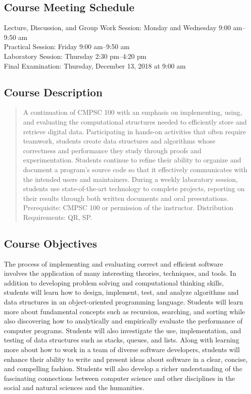 \documentclass[11pt]{article}
\begin{document}
\subsection*{Course Meeting Schedule}

Lecture, Discussion, and Group Work Session: Monday and Wednesday 9:00 am--9:50 am \\
Practical Session: Friday 9:00 am--9:50 am \\
Laboratory Session: Thursday 2:30 pm--4:20 pm \\
Final Examination: Thursday, December 13, 2018 at 9:00 am

\subsection*{Course Description}

\begin{quote}

A continuation of CMPSC 100 with an emphasis on implementing, using, and
evaluating the computational structures needed to efficiently store and retrieve
digital data. Participating in hands-on activities that often require teamwork,
students create data structures and algorithms whose correctness and performance
they study through proofs and experimentation. Students continue to refine their
ability to organize and document a program's source code so that it effectively
communicates with the intended users and maintainers. During a weekly laboratory
session, students use state-of-the-art technology to complete projects,
reporting on their results through both written documents and oral
presentations. Prerequisite: CMPSC 100 or permission of the instructor.
Distribution Requirements: QR, SP.\@ \\

\end{quote}

\subsection*{Course Objectives}

The process of implementing and evaluating correct and efficient software
involves the application of many interesting theories, techniques, and tools. In
addition to developing problem solving and computational thinking skills, students
will learn how to design, implement, test, and analyze algorithms and data
structures in an object-oriented programming language. Students will learn more
about fundamental concepts such as recursion, searching, and sorting while also
discovering how to analytically and empirically evaluate the performance of
computer programs. Students will also investigate the use, implementation, and
testing of data structures such as stacks, queues, and lists. Along with
learning more about how to work in a team of diverse software developers,
students will enhance their ability to write and present ideas about software in
a clear, concise, and compelling fashion. Students will also develop a richer
understanding of the fascinating connections between computer science and other
disciplines in the social and natural sciences and the humanities.
\end{document}
